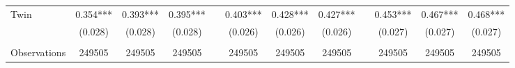 \begin{landscape}
\begin{table}[htpb!]
\begin{center}
\begin{tabular}{lcccp{2mm}cccp{2mm}ccc}
Twin&0.354***&0.393***&0.395***&&0.403***&0.428***&0.427***&&0.453***&0.467***&0.468***\\
&(0.028)&(0.028)&(0.028)&&(0.026)&(0.026)&(0.026)&&(0.027)&(0.027)&(0.027)\\
\begin{footnotesize}\end{footnotesize}&\begin{footnotesize}\end{footnotesize}&\begin{footnotesize}\end{footnotesize}&\begin{footnotesize}\end{footnotesize}&\begin{footnotesize}\end{footnotesize}&\begin{footnotesize}\end{footnotesize}&\begin{footnotesize}\end{footnotesize}&\begin{footnotesize}\end{footnotesize}&\begin{footnotesize}\end{footnotesize}&\begin{footnotesize}\end{footnotesize}&\begin{footnotesize}\end{footnotesize}&\begin{footnotesize}\end{footnotesize}\\Observations&249505&249505&249505&&249505&249505&249505&&249505&249505&249505\\

\end{tabular}
\end{center}
\end{table}
\end{landscape}
